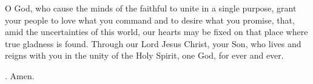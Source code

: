 \lettrine[lines=3]{O}{} God, who cause the minds of the faithful
to unite in a single purpose,
grant your people to love what you command
and to desire what you promise,
that, amid the uncertainties of this world,
our hearts may be fixed on that place
where true gladness is found.
Through our Lord Jesus Christ, your Son,
who lives and reigns with you in the unity of the Holy Spirit,
one God, for ever and ever. \par \Rbar. Amen.
